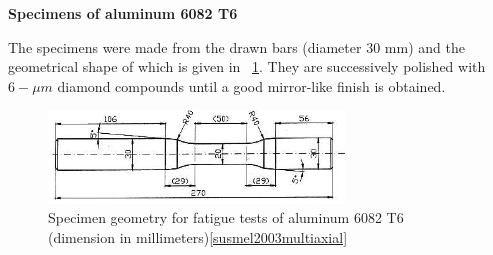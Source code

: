 \documentclass[3p,times,procedia,number]{elsarticle}
\newcommand{\figref}[1]{\figurename~\ref{#1}}
\begin{document}
\vspace{6pt}
\textbf{Specimens of aluminum 6082 T6}
\vspace{6pt}

The specimens were made from the drawn bars (diameter 30 mm) and the geometrical shape of which is given in \figref{fig:aluminum6082T6}. They are successively polished with $6-\mu m$ diamond compounds until a good mirror-like finish is obtained.
\begin{figure}[!h]
	\centering
	\includegraphics[width=0.7\textwidth]{figures//aluminum6082T6sample.png} 
	\caption{Specimen geometry for fatigue tests of aluminum 6082 T6 (dimension in millimeters)\ref{susmel2003multiaxial}}
	\label{fig:aluminum6082T6}
\end{figure}
\end{document}
